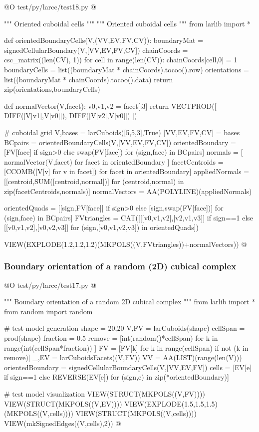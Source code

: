 \documentclass[11pt,oneside]{article}	%
\begin{document}
@O test/py/larcc/test18.py
@{""" Oriented cuboidal cells """
""" Oriented cuboidal cells """
from larlib import *

def orientedBoundaryCells(V,(VV,EV,FV,CV)):
    boundaryMat = signedCellularBoundary(V,[VV,EV,FV,CV])
    chainCoords = csc_matrix((len(CV), 1))
    for cell in range(len(CV)): chainCoords[cell,0] = 1
    boundaryCells = list((boundaryMat * chainCoords).tocoo().row)
    orientations = list((boundaryMat * chainCoords).tocoo().data)
    return zip(orientations,boundaryCells)

def normalVector(V,facet):
    v0,v1,v2 = facet[:3]
    return VECTPROD([ DIFF([V[v1],V[v0]]), DIFF([V[v2],V[v0]]) ])

# cuboidal grid
V,bases = larCuboids([5,5,3],True)
[VV,EV,FV,CV] = bases
BCpairs = orientedBoundaryCells(V,[VV,EV,FV,CV])
orientedBoundary = [FV[face] if sign>0 else swap(FV[face]) for (sign,face) in BCpairs]
normals = [ normalVector(V,facet)  for facet in orientedBoundary ]
facetCentroids = [CCOMB([V[v] for v in facet]) for facet in orientedBoundary]
appliedNormals = [[centroid,SUM([centroid,normal])] for (centroid,normal) in zip(facetCentroids,normals)]
normalVectors = AA(POLYLINE)(appliedNormals)

orientedQuads = [[sign,FV[face]] if sign>0 else [sign,swap(FV[face])] for (sign,face) in BCpairs]
FVtriangles = CAT([[[v0,v1,v2],[v2,v1,v3]] if sign==1 else [[v0,v1,v2],[v0,v2,v3]]
            for (sign,[v0,v1,v2,v3]) in orientedQuads])

VIEW(EXPLODE(1.2,1.2,1.2)(MKPOLS((V,FVtriangles))+normalVectors))
@}





\subsubsection{Boundary orientation of a random (2D) cubical complex}

@O test/py/larcc/test17.py
@{""" Boundary orientation of a random 2D cubical complex """
from larlib import *
from random import random

# test model generation
shape = 20,20
V,FV = larCuboids(shape)
cellSpan = prod(shape)
fraction = 0.5
remove = [int(random()*cellSpan) for k in range(int(cellSpan*fraction)) ]
FV = [FV[k] for k in range(cellSpan) if not (k in remove)]
_,EV = larCuboidsFacets((V,FV))
VV = AA(LIST)(range(len(V)))
orientedBoundary = signedCellularBoundaryCells(V,[VV,EV,FV])
cells = [EV[e] if sign==1 else REVERSE(EV[e]) for (sign,e) in zip(*orientedBoundary)]

# test model visualization
VIEW(STRUCT(MKPOLS((V,FV))))
VIEW(STRUCT(MKPOLS((V,EV))))
VIEW(EXPLODE(1.5,1.5,1.5)(MKPOLS((V,cells))))
VIEW(STRUCT(MKPOLS((V,cells))))
VIEW(mkSignedEdges((V,cells),2))
@}
\end{document}
